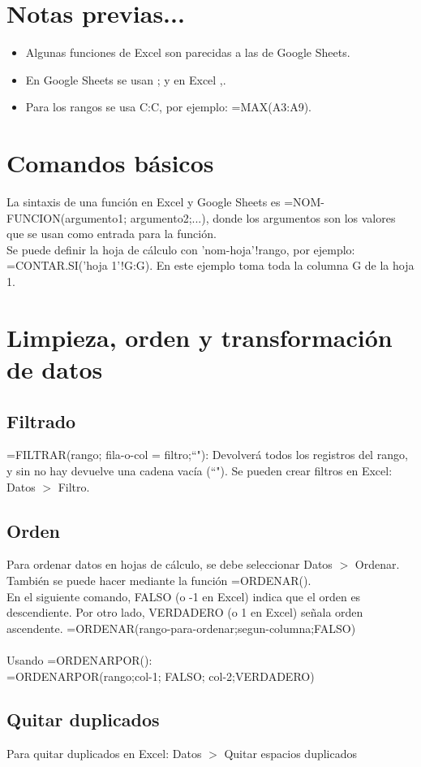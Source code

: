\documentclass[a4paper, 12pt]{book}
\begin{document}
\section{Notas previas...}
\begin{itemize}
\item Algunas funciones de Excel son parecidas a las de Google Sheets.
\item En Google Sheets se usan ; y en Excel ,.
\item Para los rangos se usa C:C, por ejemplo: =MAX(A3:A9).
\end{itemize}
\section{Comandos básicos}
La sintaxis de una función en Excel y Google Sheets es =NOM-FUNCION(argumento1; argumento2;...), donde los argumentos son los valores que se usan como entrada para la función. \\
Se puede definir la hoja de cálculo con 'nom-hoja'!rango, por ejemplo: =CONTAR.SI('hoja 1'!G:G). En este ejemplo toma toda la columna G de la hoja 1.
\section{Limpieza, orden y transformación de datos}
\subsection{Filtrado}
=FILTRAR(rango; fila-o-col = filtro;``"): Devolverá todos los registros del rango, y sin no hay devuelve una cadena vacía (``").
Se pueden crear filtros en Excel: Datos $>$ Filtro.
\subsection{Orden}
Para ordenar datos en hojas de cálculo, se debe seleccionar Datos $>$ Ordenar. También se puede hacer mediante la función =ORDENAR(). \\
En el siguiente comando, FALSO (o -1 en Excel) indica que el orden es descendiente. Por otro lado, VERDADERO (o 1 en Excel) señala orden ascendente.
=ORDENAR(rango-para-ordenar;segun-columna;FALSO) \\
\\
Usando =ORDENARPOR(): \\
=ORDENARPOR(rango;col-1; FALSO; col-2;VERDADERO)
\subsection{Quitar duplicados}
Para quitar duplicados en Excel: Datos $>$ Quitar espacios duplicados
\end{document}
